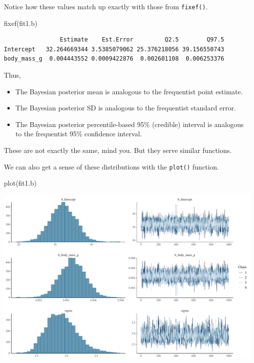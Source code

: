 \documentclass[
  letterpaper,
  DIV=11,
  numbers=noendperiod]{scrartcl}
\newenvironment{Shaded}{\begin{snugshade}}{\end{snugshade}}
\newcommand{\FunctionTok}[1]{\textcolor[rgb]{0.28,0.35,0.67}{#1}}
\newcommand{\NormalTok}[1]{\textcolor[rgb]{0.00,0.23,0.31}{#1}}
\providecommand{\tightlist}{%
  \setlength{\itemsep}{0pt}\setlength{\parskip}{0pt}}\usepackage{longtable,booktabs,array}
\begin{document}
Notice how these values match up exactly with those from
\texttt{fixef()}.

\begin{Shaded}
\begin{Highlighting}[]
\FunctionTok{fixef}\NormalTok{(fit1.b)}
\end{Highlighting}
\end{Shaded}

\begin{verbatim}
                Estimate    Est.Error         Q2.5        Q97.5
Intercept   32.264669344 3.5385079062 25.376218056 39.156550743
body_mass_g  0.004443552 0.0009422876  0.002601108  0.006253376
\end{verbatim}

Thus,

\begin{itemize}
\tightlist
\item
  The Bayesian posterior mean is analogous to the frequentist point
  estimate.
\item
  The Bayesian posterior SD is analogous to the frequentist standard
  error.
\item
  The Bayesian posterior percentile-based 95\% (credible) interval is
  analogous to the frequentist 95\% confidence interval.
\end{itemize}

These are not exactly the same, mind you. But they serve similar
functions.

We can also get a sense of these distributions with the \texttt{plot()}
function.

\begin{Shaded}
\begin{Highlighting}[]
\FunctionTok{plot}\NormalTok{(fit1.b)}
\end{Highlighting}
\end{Shaded}

\includegraphics{Bayes_Lab_1_files/figure-pdf/unnamed-chunk-37-1.pdf}
\end{document}
